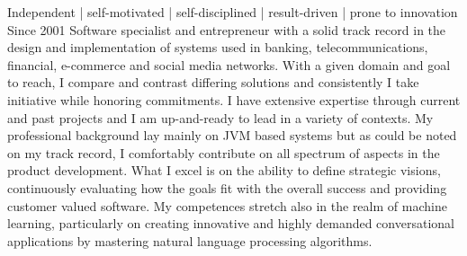 

\begin{cventries}
  \cventry
    {} %
    {Independent | self-motivated | self-disciplined | result-driven | prone to innovation}
    {} %
    {Since 2001} %
    {
      Software specialist and entrepreneur with a solid track record in the  design and implementation of systems
      used in banking, telecommunications, financial, e-commerce and social media networks.
      With a given domain and  goal to reach, I compare and contrast differing solutions and consistently I take
      initiative while honoring commitments. I have extensive expertise through current and past projects and I am up-and-ready
      to lead in a variety of contexts. My professional background lay mainly on JVM based systems but as could
      be noted on my track record, I comfortably contribute on all spectrum of aspects in the product development.
      What I excel is on the ability to define strategic visions, continuously evaluating how the goals fit with
      the overall success and providing customer valued software. My competences stretch also in the realm of machine learning,
      particularly on creating innovative and highly demanded conversational applications by mastering natural language
      processing algorithms.
    }


\end{cventries}
